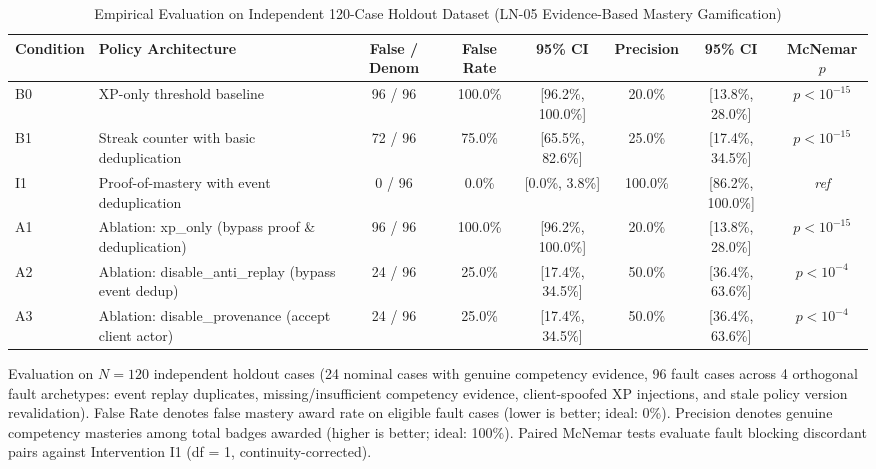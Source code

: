 \begin{table}[htbp]
\centering
\small
\caption{Empirical Evaluation on Independent 120-Case Holdout Dataset (LN-05 Evidence-Based Mastery Gamification)}
\label{tab:ln-05-holdout-benchmark}
\begin{tabular}{llcccccc}
\toprule
Condition & Policy Architecture & False / Denom & False Rate & 95\% CI & Precision & 95\% CI & McNemar $p$ \\
\midrule
B0 & XP-only threshold baseline & 96 / 96 & 100.0\% & [96.2\%, 100.0\%] & 20.0\% & [13.8\%, 28.0\%] & $p < 10^{-15}$ \\
B1 & Streak counter with basic deduplication & 72 / 96 & 75.0\% & [65.5\%, 82.6\%] & 25.0\% & [17.4\%, 34.5\%] & $p < 10^{-15}$ \\
I1 & Proof-of-mastery with event deduplication & 0 / 96 & 0.0\% & [0.0\%, 3.8\%] & 100.0\% & [86.2\%, 100.0\%] & \textit{ref} \\
A1 & Ablation: xp\_only (bypass proof \& deduplication) & 96 / 96 & 100.0\% & [96.2\%, 100.0\%] & 20.0\% & [13.8\%, 28.0\%] & $p < 10^{-15}$ \\
A2 & Ablation: disable\_anti\_replay (bypass event dedup) & 24 / 96 & 25.0\% & [17.4\%, 34.5\%] & 50.0\% & [36.4\%, 63.6\%] & $p < 10^{-4}$ \\
A3 & Ablation: disable\_provenance (accept client actor) & 24 / 96 & 25.0\% & [17.4\%, 34.5\%] & 50.0\% & [36.4\%, 63.6\%] & $p < 10^{-4}$ \\
\bottomrule
\end{tabular}
\par\smallskip
\begin{minipage}{0.98\linewidth}\footnotesize
Evaluation on $N=120$ independent holdout cases (24 nominal cases with genuine competency evidence, 96 fault cases across 4 orthogonal fault archetypes: event replay duplicates, missing/insufficient competency evidence, client-spoofed XP injections, and stale policy version revalidation). False Rate denotes false mastery award rate on eligible fault cases (lower is better; ideal: 0\%). Precision denotes genuine competency masteries among total badges awarded (higher is better; ideal: 100\%). Paired McNemar tests evaluate fault blocking discordant pairs against Intervention I1 (df = 1, continuity-corrected).
\end{minipage}
\end{table}
